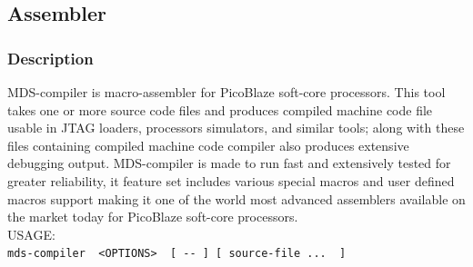     \subsection{Assembler}
        \subsubsection{Description}
        MDS-compiler is macro-assembler for PicoBlaze soft-core processors. This tool takes one or more source code files and produces compiled machine code file usable in JTAG loaders, processors
        simulators, and similar tools; along with these files containing compiled machine code compiler also produces extensive debugging
        output. MDS-compiler is made to run fast and extensively tested for greater reliability, it feature set includes various special
        macros and user defined macros support making it one of the world most advanced assemblers available on the market today for PicoBlaze
        soft-core processors.\\

        USAGE:
        {
            ~\\
            \usecodefont
            \verb'mds-compiler  <OPTIONS>  [ -- ] [ source-file ...  ]'\\
        }
